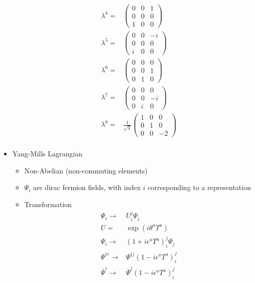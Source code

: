 \begin{itemize}
\begin{itemize}
\begin{equation}
\begin{split}
        \lambda^4=&\begin{pmatrix}0&0&1\\ 0&0&0\\ 1&0&0\end{pmatrix} \\
        \lambda^5=&\begin{pmatrix}0&0&-i\\ 0&0&0\\ i&0&0\end{pmatrix} \\
        \lambda^6=&\begin{pmatrix}0&0&0\\ 0&0&1\\ 0&1&0\end{pmatrix} \\
        \lambda^7=&\begin{pmatrix}0&0&0\\ 0&0&-i\\ 0&i&0\end{pmatrix} \\
        \lambda^8=&\frac{1}{\sqrt{3}}\begin{pmatrix}1&0&0\\ 0&1&0\\ 0&0&-2\end{pmatrix} \\
        \end{split}\end{equation}
    \end{itemize}
    \item Yang-Mills Lagrangian \cite{wells}
    \begin{itemize}
        \item Non-Abelian (non-commuting elements) \cite{wells}
        \item $\Psi_i$ are dirac fermion fields, with index $i$ corresponding to a representation \cite{wells}
        \item Transformation \cite{wells}
        \begin{equation}\begin{split}
        \Psi_i\to&U_i^j\Psi_j \\
        U=&\exp{(i\theta^aT^a)}\\
        \Psi_i\to&(1+i\epsilon^aT^a)_i^j\Psi_j \\
        \Psi^{\dagger i}\to&\Psi^{\dagger j}(1-i\epsilon^aT^a)_i^j \\
        \overline{\Psi}^{i}\to&\overline{\Psi}^{j}(1-i\epsilon^aT^a)_i^j \\

\end{split}
\end{equation}
\end{itemize}
\end{itemize}
